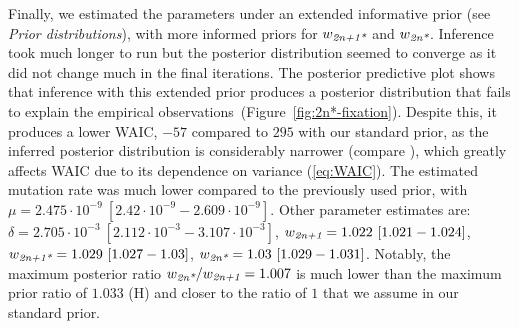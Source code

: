 \documentclass[12pt]{extarticle}
\newcommand{\anwt}{\emph{2n+1}}
\newcommand{\eumt}{\emph{2n*}}
\newcommand{\anmt}{\emph{2n+1*}}
\begin{document}
Finally, we estimated the parameters under an extended informative prior (see \emph{Prior distributions}), with more informed priors for $w_{\anmt}$ and $w_{\eumt}$.
Inference took much longer to run but the posterior distribution seemed to converge as it did not change much in the final iterations. 
The posterior predictive plot shows that inference with this extended prior produces a posterior distribution that fails to explain the empirical observations~(Figure~\ref{fig:2n*-fixation}).
Despite this, it produces a lower WAIC, $-57$ compared to $295$ with our standard prior, as the inferred posterior distribution is considerably narrower (compare ), which greatly affects WAIC due to its dependence on variance (\cref{eq:WAIC}).
The estimated mutation rate was much lower compared to the previously used prior, with $\mu=2.475\cdot10^{-9}\ [2.42\cdot10^{-9}-2.609\cdot10^{-9}]$. Other parameter estimates are: $\delta=2.705\cdot10^{-3}\ [2.112\cdot10^{-3}-3.107\cdot10^{-3}]$,
$w_{\anwt}=1.022\ [1.021-1.024]$,
$w_{\anmt}=1.029\ [1.027-1.03]$,
$w_{\eumt}=1.03\ [1.029-1.031]$. 
Notably, the maximum posterior ratio $w_{\eumt}/w_{\anwt}=1.007$ is much lower than the maximum prior ratio of $1.033$ (H) and closer to the ratio of $1$ that we assume in our standard prior.
\end{document}
